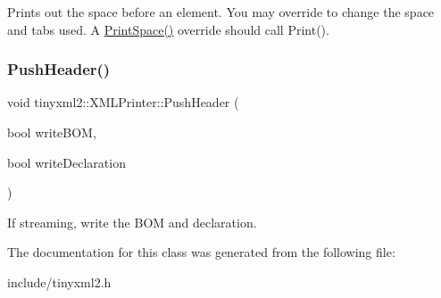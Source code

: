 Prints out the space before an element. You may override to change the space and tabs used. A \mbox{\hyperlink{classtinyxml2_1_1XMLPrinter_a01148e2ebe6776e38c5a3e41bc5feb74}{Print\+Space()}} override should call Print(). \mbox{\label{classtinyxml2_1_1XMLPrinter_a178c608ce8476043d5d6513819cde903}} 
\subsubsection{\texorpdfstring{PushHeader()}{PushHeader()}}
{\footnotesize\ttfamily void tinyxml2\+::\+X\+M\+L\+Printer\+::\+Push\+Header (\begin{DoxyParamCaption}\item[{bool}]{write\+B\+OM,  }\item[{bool}]{write\+Declaration }\end{DoxyParamCaption})}

If streaming, write the B\+OM and declaration. 

The documentation for this class was generated from the following file\+:\begin{DoxyCompactItemize}
\item 
include/tinyxml2.\+h\end{DoxyCompactItemize}
